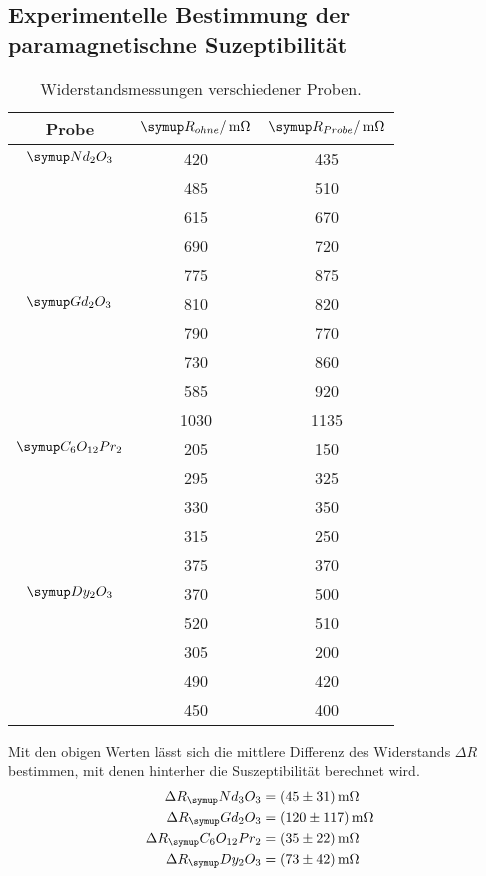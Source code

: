 \subsection{Experimentelle Bestimmung der paramagnetischne Suzeptibilität}
\begin{table}
  \centering
  \begin{tabular}{c c c}
    \toprule
    Probe & $\su{R_{ohne}/\mOhm}$ &$\su{R_{Probe}}/\mOhm$ \\
    \midrule
    $\su{Nd_2O_3}$   & 420 & 435 \\
                     & 485 & 510 \\
                     & 615 & 670 \\
                     & 690 & 720 \\
                     & 775 & 875 \\ \hline
    $\su{Gd_2O_3}$   & 810 & 820 \\
                     & 790 & 770 \\
                     & 730 & 860 \\
                     & 585 & 920 \\
                     &1030 &1135 \\ \hline
    $\su{C_6O_{12}Pr_2}$  & 205 & 150 \\
                          & 295 & 325 \\
                          & 330 & 350 \\
                          & 315 & 250 \\
                          & 375 & 370 \\ \hline
    $\su{Dy_2O_3}$   & 370 & 500 \\
                     & 520 & 510 \\
                     & 305 & 200 \\
                     & 490 & 420 \\
                     & 450 & 400 \\
    \bottomrule
  \end{tabular}
  \caption{Widerstandsmessungen verschiedener Proben.}
  \label{tab:mess2}
\end{table}
Mit den obigen Werten lässt sich die mittlere Differenz des Widerstands
$\Delta R$ bestimmen, mit denen hinterher die Suszeptibilität berechnet wird.
\begin{align*}
  \Delta R_\su{Nd_3O_3}    &= ( 45 \pm  31) \mOhm \\
  \Delta R_\su{Gd_2O_3}    &= (120 \pm 117) \mOhm \\
  \Delta R_\su{C_6O_{12}Pr_2} &= ( 35 \pm  22) \mOhm \\
  \Delta R_\su{Dy_2O_3}    &= ( 73 \pm  42) \mOhm
\end{align*}

